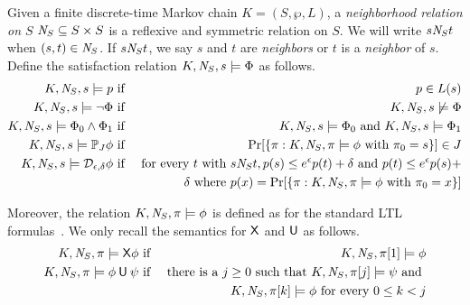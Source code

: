 
Given a finite discrete-time Markov chain $K = (S, \wp, L)$, a
\emph{neighborhood relation on $S$} $\mathit{N}_{S} \subseteq S \times S$
is a reflexive and symmetric relation on $S$. We will write $s
\mathit{N}_{S} t$ when $(s, t) \in \mathit{N}_{S}$. If $s \mathit{N}_{S} t$,
we say $s$ and $t$ are \emph{neighbors} or $t$ is a \emph{neighbor} of
$s$. Define the satisfaction relation $K, \mathit{N}_{S}, s
\models \Phi$ as follows.
\begin{eqnarray*}
  K, \mathit{N}_{S}, s \models p
  & \textmd{ if } &
  p \in L(s)\\
  K, \mathit{N}_{S}, s \models \neg \Phi
  & \textmd{ if } &
  K, \mathit{N}_{S}, s \not\models \Phi\\
  K, \mathit{N}_{S}, s \models \Phi_0 \wedge \Phi_1
  & \textmd{ if } &
  K, \mathit{N}_{S}, s \models \Phi_0 \textmd{ and }
  K, \mathit{N}_{S}, s \models \Phi_1\\
  K, \mathit{N}_{S}, s \models \mathbb{P}_{J} \phi
  & \textmd{ if } &
  \Pr [\{ \pi : K, \mathit{N}_{S}, \pi \models \phi \textmd{ with }
                    \pi_0 = s\}] \in J \\
  K, \mathit{N}_{S}, s \models \mathcal{D}_{{\epsilon}, {\delta}} \phi
  & \textmd{ if } &
  \textmd{for every } t \textmd{ with }  s \mathit{N}_{S} t,
      p(s) \leq e^{\epsilon} p(t) + \delta \textmd{ and }
      p(t) \leq e^{\epsilon} p(s)  +  \\
  & &  \delta \textmd{ where } p(x) = \Pr [\{
      \pi : K, \mathit{N}_{S}, \pi \models \phi \textmd{ with }
      \pi_0 = x \}]
\end{eqnarray*}

Moreover, the relation $K, \mathit{N}_{S}, \pi \models \phi$ is defined as
for the standard LTL formulas~\cite{which-to-cite?}. We only recall the semantics for $\mathsf{X}$ and $\mathbin{\mathsf{U}}$ as follows.
\begin{eqnarray*}
  K, \neighbor{S}, \pi \models \X \phi
  & \textmd{ if } &
  K, \neighbor{S}, \pi[1] \models \phi\\
  K, \neighbor{S}, \pi \models \phi \until \psi
  & \textmd{ if } &
  \textmd{there is a } j \geq 0 \textmd{ such that }
  K, \neighbor{S}, \pi[j] \models \psi \textmd{ and } \\
  & & K, \neighbor{S}, \pi[k] \models \phi
      \textmd{ for every } 0 \leq k < j
\hide{
  K, \neighbor{S}, \pi \models \Phi \buntil{n} \Psi
  & \textmd{ if } &
  \textmd{there is a } 0 \leq j \leq n \textmd{ such that }
  K, \neighbor{S}, \pi[j] \models \Psi \textmd{ and } \\
  & & K, \neighbor{S}, \pi[k] \models \Phi
      \textmd{ for every } 0 \leq k < j
}
\end{eqnarray*}

